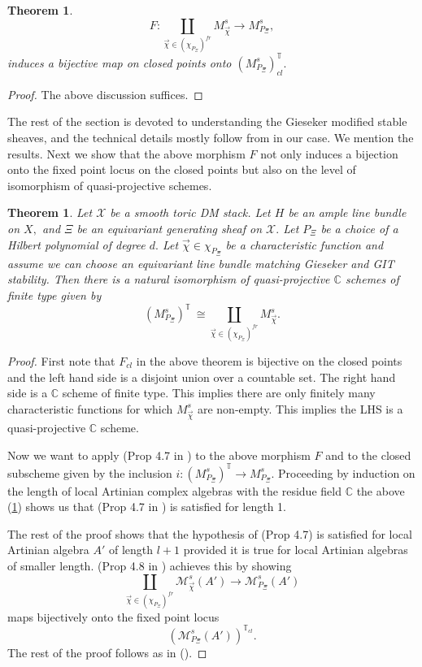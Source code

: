 \documentclass[10pt]{amsart}
\newtheorem{thm}[prop]{Theorem}
\newcommand{\sX}{{\mathcal X}}
\numberwithin{equation}{subsection}
\begin{document}
\begin{thm}\label{claim}
$$F:\coprod\limits_{\vec\chi \in (\chi_{P_{\Xi}})^{fr}}M^{s} _{\vec\chi}\to M^{s}_{P_{\Xi}},$$ induces a bijective map on closed points onto $(M^{s}_{P_{\Xi}})^{\mathbb T}_{cl}.$  
\end{thm}
\begin{proof}
The above discussion suffices.   
\end{proof}
The rest of the section is devoted to understanding the Gieseker modified stable sheaves, and the technical details mostly follow from \cite{Koo2} in our case. We mention the results.
Next we show that the above morphism $F$ not only induces a bijection onto the fixed point locus on the closed points but also on the level of isomorphism of quasi-projective schemes.\par
\begin{thm}
Let $\sX$ be a smooth toric DM stack. Let $H$ be an ample line bundle on $X,$ and $\Xi$ be an equivariant generating sheaf on $\sX.$ Let $P_{\Xi}$ be a choice of a Hilbert polynomial of degree $d.$ Let $\vec\chi \in \chi_{P_{\Xi}}$ be a characteristic function and assume we can choose an equivariant line bundle matching Gieseker and GIT stability. Then there is a natural isomorphism of quasi-projective $\mathbb{C}$ schemes of finite type given by
$$(M^s_{P_{\Xi}})^\mathbb{T}\ \cong \coprod_{\vec\chi \in (\chi_{P_{\Xi}})^{fr}}M^s_{\vec\chi}.$$
\end{thm}
\begin{proof}
First note that $F_{cl}$ in the above theorem is bijective on the closed points and the left hand side is a disjoint union over a countable set. The right hand side is a $\mathbb{C}$ scheme of finite type. This implies there are only finitely many characteristic functions for which $M^s_{\vec\chi}$ are non-empty. This implies the LHS is a quasi-projective $\mathbb{C}$ scheme.\par
Now we want to apply (Prop 4.7 in \cite{Koo2}) to the above morphism $F$ and to the closed subscheme given by the inclusion $i:(M^s_{P_{\Xi}})^{\mathbb{T}}\to M^s_{P_{\Xi}}.$ Proceeding by induction on the length of local Artinian complex algebras with the residue field $\mathbb{C}$ the above (\ref{claim}) shows us that (Prop 4.7 in \cite{Koo2}) is satisfied for length 1.\par 
The rest of the proof shows that the hypothesis of (Prop 4.7) is satisfied for local Artinian algebra $A'$ of length $l+1$ provided it is true for local Artinian algebras of smaller length. (Prop 4.8 in \cite{Koo2}) achieves this by showing $$\coprod_{\vec\chi\in (\chi_{P_{\Xi}})^{fr}}\mathscr{M}^s_{\vec\chi}(A')\to \mathscr{M}^s_{P_{\Xi}}(A')$$ maps bijectively onto the fixed point locus $$(\mathscr{M}^s_{P_{\Xi}}(A'))^{\mathbb{T}_{cl}}.$$ The rest of the proof follows as in (\cite{Koo2}).

\end{proof}
\end{document}
